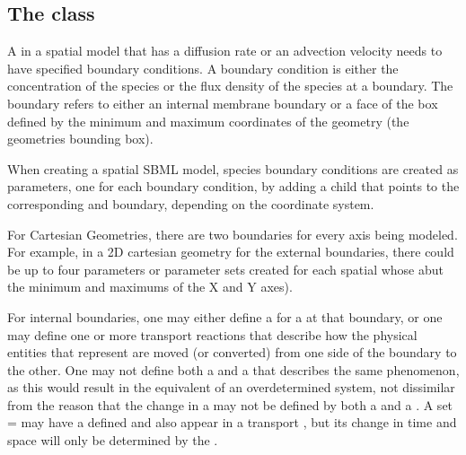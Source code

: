 \subsection{The  class}
\label{boundarycondition-class}
A \Species in a spatial model that has a diffusion rate or an advection velocity needs to have specified boundary conditions. A boundary condition is either the concentration of the species or the flux density of the species at a boundary.  The boundary refers to either an internal membrane boundary or a face of the box defined by the minimum and maximum coordinates of the geometry (the geometries bounding box).

When creating a spatial SBML model, species boundary conditions are created as parameters, one for each boundary condition, by adding a child \BoundaryCondition that points to the corresponding \Species and boundary, depending on the coordinate system.

For Cartesian Geometries, there are two boundaries for every axis being modeled.  For example, in a 2D cartesian geometry for the external boundaries, there could be up to four parameters or parameter sets created for each spatial \Species whose \Compartments abut the minimum and maximums of the X and Y axes).



For internal boundaries, one may either define a \BoundaryCondition for a \Species at that boundary, or one may define one or more transport reactions that describe how the physical entities that \Species represent are moved (or converted) from one side of the boundary to the other.  One may not define both a \BoundaryCondition and a \Reaction that describes the same phenomenon, as this would result in the equivalent of an overdetermined system, not dissimilar from the reason that the change in a \Species may not be defined by both a \Reaction and a \RateRule.  A \Species set  =  may have a defined \BoundaryCondition and also appear in a transport \Reaction, but its change in time and space will only be determined by the \BoundaryCondition.

